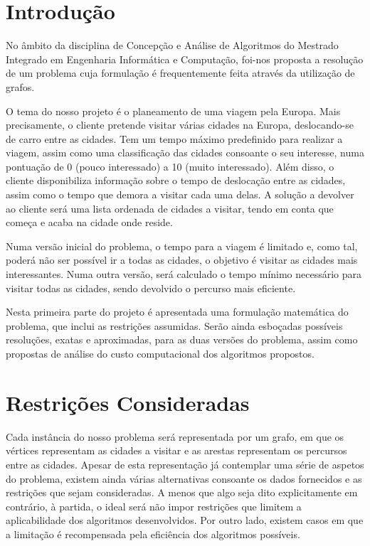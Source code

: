 \documentclass[12pt,a4paper,reqno]{report}
\numberwithin{figure}{section}
\numberwithin{equation}{section}
\begin{document}


\tableofcontents


\chapter{Introdução}

No âmbito da disciplina de Concepção e Análise de Algoritmos do Mestrado Integrado em Engenharia Informática e Computação, foi-nos proposta a resolução de um problema cuja formulação é frequentemente feita através da utilização de grafos.

O tema do nosso projeto é o planeamento de uma viagem pela Europa. Mais precisamente, o cliente pretende visitar várias cidades na Europa, deslocando-se de carro entre as cidades. Tem um tempo máximo predefinido para realizar a viagem, assim como uma classificação das cidades consoante o seu interesse, numa pontuação de 0 (pouco interessado) a 10 (muito interessado). Além disso, o cliente disponibiliza informação sobre o tempo de deslocação entre as cidades, assim como o tempo que demora a visitar cada uma delas. A solução a devolver ao cliente será uma lista ordenada de cidades a visitar, tendo em conta que começa e acaba na cidade onde reside.

Numa versão inicial do problema, o tempo para a viagem é limitado e, como tal, poderá não ser possível ir a todas as cidades, o objetivo é visitar as cidades mais interessantes. Numa outra versão, será calculado o tempo mínimo necessário para visitar todas as cidades, sendo devolvido o percurso mais eficiente.

Nesta primeira parte do projeto é apresentada uma formulação matemática do problema, que inclui as restrições assumidas. Serão ainda esboçadas possíveis resoluções, exatas e aproximadas, para as duas versões do problema, assim como propostas de análise do custo computacional dos algoritmos propostos.


\chapter{Restrições Consideradas}

Cada instância do nosso problema será representada por um grafo, em que os vértices representam as cidades a visitar e as arestas representam os percursos entre as cidades. Apesar de esta representação já contemplar uma série de aspetos do problema, existem ainda várias alternativas consoante os dados fornecidos e as restrições que sejam consideradas. A menos que algo seja dito explicitamente em contrário, à partida, o ideal será não impor restrições que limitem a aplicabilidade dos algoritmos desenvolvidos. Por outro lado, existem casos em que a limitação é recompensada pela eficiência dos algoritmos possíveis.
\end{document}
